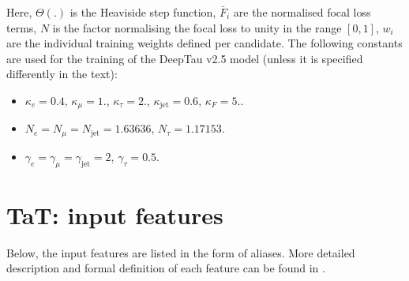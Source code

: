 Here, $\Theta(.)$ is the Heaviside step function, $\bar{F}_i$ are the normalised focal loss terms, $N$ is the factor normalising the focal loss to unity in the range $[0,1]$, $w_i$ are the individual training weights defined per \tauh candidate. The following constants are used for the training of the DeepTau v2.5 model (unless it is specified differently in the text):
\begin{itemize}
    \item $\kappa_e = 0.4$, $\kappa_\mu = 1.$, $\kappa_\tau = 2.$, $\kappa_\text{jet} = 0.6$, $\kappa_F = 5.$.
    \item $N_e = N_\mu = N_\text{jet} = 1.63636$, $N_\tau = 1.17153$.
    \item $\gamma_e = \gamma_\mu = \gamma_\text{jet} = 2$, $\gamma_\tau = 0.5$.
\end{itemize}

\newpage
\section{TaT: input features}\label{app:feats}
Below, the input features are listed in the form of aliases. More detailed description and formal definition of each feature can be found in \cite{code:tauml, code:tatoo}.


